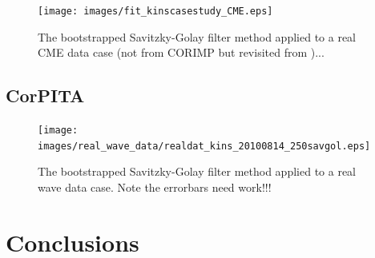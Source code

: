 \documentclass[structabstract]{aa}
\begin{document}

\begin{figure}
\centering
\texttt{[image: images/fit\_kinscasestudy\_CME.eps]}
\caption{The bootstrapped Savitzky-Golay filter method applied to a real CME data case (not from CORIMP but revisited from \citealt{2009A&A...495..325B})...}
\label{fig_savgol_CME}
\end{figure}



\subsection{CorPITA}
\label{subsect:corpita}

\begin{figure}
\centering
\texttt{[image: images/real\_wave\_data/realdat\_kins\_20100814\_250savgol.eps]}
\caption{The bootstrapped Savitzky-Golay filter method applied to a real wave data case. Note the errorbars need work!!!}
\label{fig_savgol_wave}
\end{figure}




\section{Conclusions}
\label{sect:conclusions}
\end{document}
